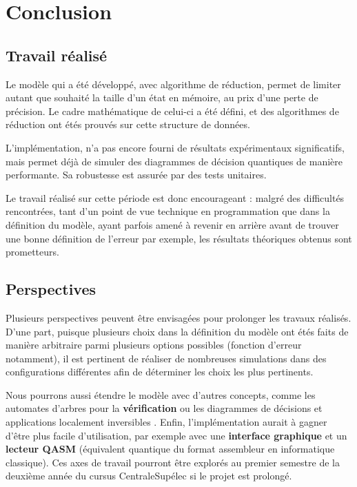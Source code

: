 
\chapter{Conclusion} %
\label{ch:Conclusion}

\section{Travail réalisé}

Le modèle qui a été développé, avec algorithme de réduction, permet de limiter autant que souhaité la taille d'un état en mémoire, au prix d'une perte de précision. Le cadre mathématique de celui-ci a été défini, et des algorithmes de réduction ont étés prouvés sur cette structure de données.

L'implémentation, n'a pas encore fourni de résultats expérimentaux significatifs, mais permet déjà de simuler des diagrammes de décision quantiques de manière performante. Sa robustesse est assurée par des tests unitaires.

Le travail réalisé sur cette période est donc encourageant : malgré des difficultés rencontrées, tant d'un point de vue technique en programmation que dans la définition du modèle, ayant parfois amené à revenir en arrière avant de trouver une bonne définition de l'erreur par exemple, les résultats théoriques obtenus sont prometteurs.

\section{Perspectives}

Plusieurs perspectives peuvent être envisagées pour prolonger les travaux réalisés. D'une part, puisque plusieurs choix dans la définition du modèle ont étés faits de manière arbitraire parmi plusieurs options possibles (fonction d'erreur notamment), il est pertinent de réaliser de nombreuses simulations dans des configurations différentes afin de déterminer les choix les plus pertinents.

Nous pourrons aussi étendre le modèle avec d'autres concepts, comme les automates d'arbres pour la \textbf{vérification} \cite{Chen_2023} ou les diagrammes de décisions et applications localement inversibles \cite{Vinkhuijzen_2023}. Enfin, l'implémentation aurait à gagner d'être plus facile d'utilisation, par exemple avec une \textbf{interface graphique} et un \textbf{lecteur QASM} (équivalent quantique du format assembleur en informatique classique). Ces axes de travail pourront être explorés au premier semestre de la deuxième année du cursus CentraleSupélec si le projet est prolongé.